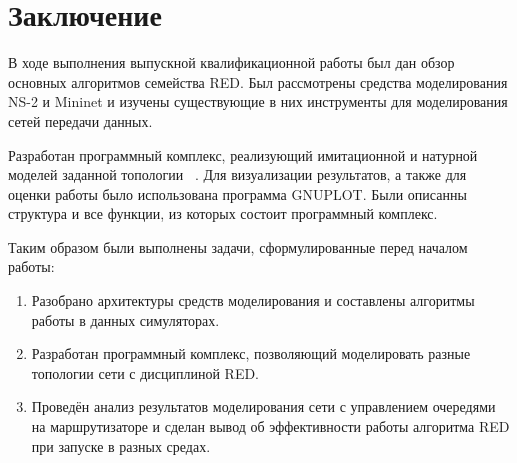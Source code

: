 \chapter*{Заключение}

В ходе выполнения выпускной квалификационной работы был дан обзор
основных алгоритмов семейства RED. Был рассмотрены
средства моделирования NS-2 и Mininet и изучены существующие в них
инструменты для моделирования сетей передачи данных. 

Разработан программный комплекс, реализующий имитационной и натурной
моделей заданной топологии ~\cite{red-git}. Для визуализации результатов,
а также для оценки работы было использована программа GNUPLOT. Были описанны
структура и все функции, из которых состоит программный комплекс.   

Таким образом были выполнены задачи, сформулированные перед началом
работы:

\begin{enumerate}
\item Разобрано архитектуры средств моделирования и составлены алгоритмы
работы в данных симуляторах.
\item Разработан программный комплекс, позволяющий моделировать
разные топологии сети с дисциплиной RED.
\item Проведён анализ результатов моделирования сети с управлением
  очередями на маршрутизаторе и сделан вывод об эффективности работы
  алгоритма RED при запуске в разных средах.
\end{enumerate}


\clearpage


